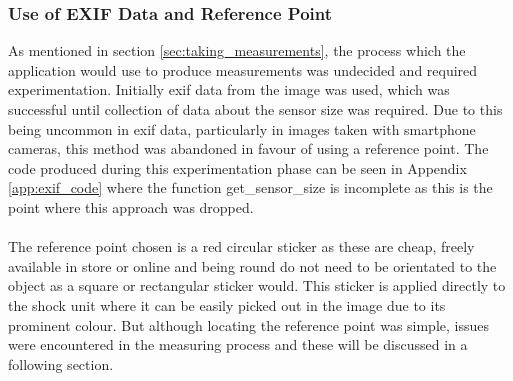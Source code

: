 		\subsubsection{Use of EXIF Data and Reference Point}
			As mentioned in section \ref{sec:taking_measurements}, the process which the application would use to produce measurements was undecided and required experimentation. Initially \gls{exif} data from the image was used, which was successful until collection of data about the sensor size was required. Due to this being uncommon in \gls{exif} data, particularly in images taken with smartphone cameras, this method was abandoned in favour of using a reference point. The code produced during this experimentation phase can be seen in Appendix \ref{app:exif_code} where the function {\ttfamily get\_sensor\_size} is incomplete as this is the point where this approach was dropped.
			\\\\
			The reference point chosen is a red circular sticker as these are cheap, freely available in store or online and being round do not need to be orientated to the object as a square or rectangular sticker would. This sticker is applied directly to the shock unit where it can be easily picked out in the image due to its prominent colour. But although locating the reference point was simple, issues were encountered in the measuring process and these will be discussed in a following section.
